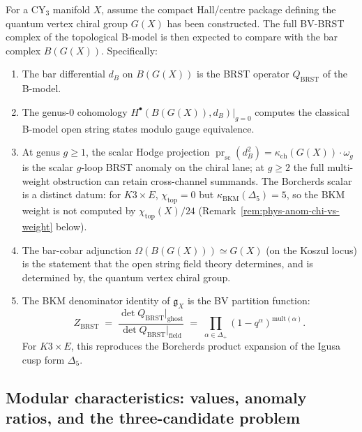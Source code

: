 \begin{conjecture}
\label{conj:phys-bv-cy3-bar}
\ClaimStatusConjectured
For a CY$_3$ manifold $X$, assume the compact Hall/centre package defining the quantum vertex chiral group \(G(X)\) has been constructed. The full BV-BRST complex of the topological B-model is then expected to compare with the bar complex \(B(G(X))\). Specifically:
\begin{enumerate}[label=\textup{(\roman*)}]
 \item The bar differential $d_B$ on $B(G(X))$ is the BRST operator $Q_{\mathrm{BRST}}$ of the B-model.
 \item The genus-$0$ cohomology $H^\bullet(B(G(X)), d_B)|_{g=0}$ computes the classical B-model open string states modulo gauge equivalence.
 \item At genus $g \geq 1$, the scalar Hodge projection
 $\operatorname{pr}_{\mathrm{sc}}(d_B^2)
 = \kappa_{\mathrm{ch}}(G(X))\cdot\omega_g$ is the scalar $g$-loop
 BRST anomaly on the chiral lane; at $g\geq2$ the full multi-weight
 obstruction can retain cross-channel summands. The Borcherds scalar is a distinct datum: for $K3 \times E$, $\chi_{\mathrm{top}} = 0$ but $\kappa_{\mathrm{BKM}}(\Delta_5) = 5$, so the BKM weight is not computed by $\chi_{\mathrm{top}}(X)/24$ (Remark~\ref{rem:phys-anom-chi-vs-weight} below).
 \item The bar-cobar adjunction $\Omega(B(G(X))) \simeq G(X)$ (on the Koszul locus) is the statement that the open string field theory determines, and is determined by, the quantum vertex chiral group.
 \item The BKM denominator identity of $\mathfrak{g}_X$ is the BV partition function:
 \[
 Z_{\mathrm{BRST}} \;=\;
 \frac{\det Q_{\mathrm{BRST}}|_{\mathrm{ghost}}}{\det Q_{\mathrm{BRST}}|_{\mathrm{field}}}
 \;=\; \prod_{\alpha \in \Delta_+} (1 - q^\alpha)^{\mathrm{mult}(\alpha)}.
 \]
 For $K3 \times E$, this reproduces the Borcherds product expansion of the Igusa cusp form $\Delta_5$.
\end{enumerate}
\end{conjecture}

\subsection{Modular characteristics: values, anomaly ratios, and the three-candidate problem}
\label{subsec:phys-anom-kappa-table}

